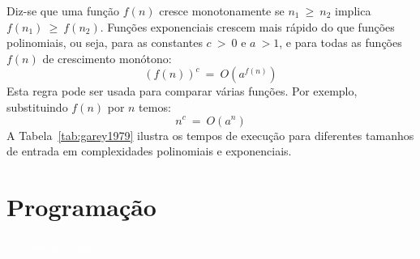 \documentclass[11pt,fleqn]{book} %
\begin{document}
Diz-se que uma função $f(n)$ cresce monotonamente se $n_1~\geq~n_2$ implica $f(n_1)~\geq~f(n_2)$.
Funções exponenciais crescem mais rápido do que funções polinomiais, ou seja, para as constantes $c~>~0$ e $a~> 1$, e para todas as funções $f(n)$ de crescimento monótono:
$$ (f(n))^c~=~O(a^{f(n)}) $$
Esta regra pode ser usada para comparar várias funções. Por exemplo, substituindo $f(n)$ por $n$ temos:
$$ n^c~=~O(a^n) $$
A Tabela~\ref{tab:garey1979} ilustra os tempos de execução para diferentes tamanhos de entrada em complexidades polinomiais e exponenciais.
\begin{table}[htbp]
\centering
\caption{Comparação de tempos de execução polinomiais e exponenciais assumindo que 0,000001s é o tempo gasto para um $n = 1$. Adaptado de ~\textcite{garey1979}.}
\label{tab:garey1979}
\end{table}


\chapter{Programação}\label{programacao}
\vspace{6em}
\begin{flushright}
	\textit{\textcolor{white}{Um bonita citação...}}
\end{flushright}
\vspace{12em}
\end{document}
